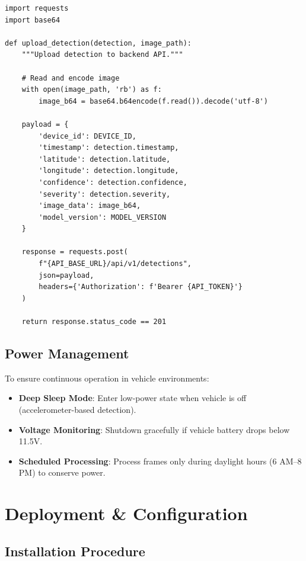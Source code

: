 \documentclass[12pt]{article}
\begin{document}
\begin{lstlisting}[caption={Detection Upload Request}, label={lst:upload-request}]
import requests
import base64

def upload_detection(detection, image_path):
    """Upload detection to backend API."""
    
    # Read and encode image
    with open(image_path, 'rb') as f:
        image_b64 = base64.b64encode(f.read()).decode('utf-8')
    
    payload = {
        'device_id': DEVICE_ID,
        'timestamp': detection.timestamp,
        'latitude': detection.latitude,
        'longitude': detection.longitude,
        'confidence': detection.confidence,
        'severity': detection.severity,
        'image_data': image_b64,
        'model_version': MODEL_VERSION
    }
    
    response = requests.post(
        f"{API_BASE_URL}/api/v1/detections",
        json=payload,
        headers={'Authorization': f'Bearer {API_TOKEN}'}
    )
    
    return response.status_code == 201
\end{lstlisting}

\subsection{Power Management}

To ensure continuous operation in vehicle environments:

\begin{itemize}
    \item \textbf{Deep Sleep Mode}: Enter low-power state when vehicle is off (accelerometer-based detection).
    \item \textbf{Voltage Monitoring}: Shutdown gracefully if vehicle battery drops below 11.5V.
    \item \textbf{Scheduled Processing}: Process frames only during daylight hours (6 AM--8 PM) to conserve power.
\end{itemize}

\clearpage

\section{Deployment \& Configuration}

\subsection{Installation Procedure}
\end{document}
